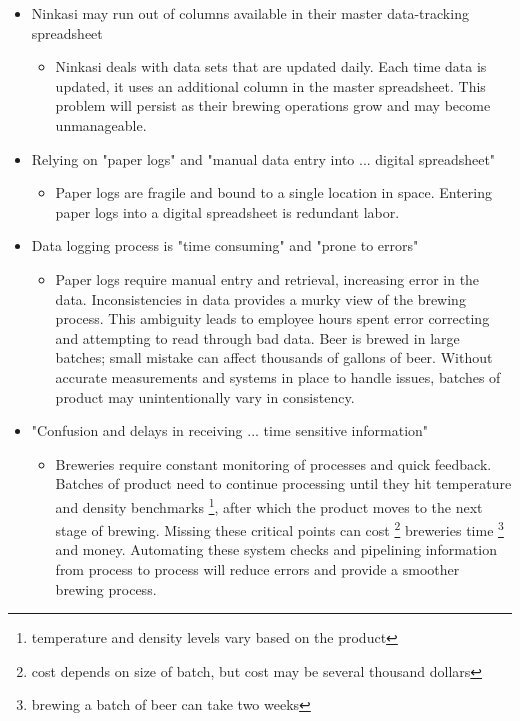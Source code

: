 \documentclass[draftclsnofoot,onecolumn,letterpaper,10pt]{IEEEtran}
\begin{document}
\begin{itemize}
    \item {Ninkasi may run out of columns available in their master data-tracking spreadsheet}
      \begin{itemize}
      \item {
				Ninkasi deals with data sets that are updated daily.
				Each time data is updated, it uses an additional column in the master spreadsheet.
				This problem will persist as their brewing operations grow and may become unmanageable.
			}
  	\end{itemize}

	\item {Relying on "paper logs" and "manual data entry into ... digital spreadsheet"}
	    \begin{itemize}
			\item {Paper logs are fragile and bound to a single location in space. Entering paper logs into a digital spreadsheet is redundant labor.}
	    \end{itemize}

	\item {Data logging process is "time consuming" and "prone to errors"}
      		\begin{itemize}
			\item {Paper logs require manual entry and retrieval, increasing error in the data.
				Inconsistencies in data provides a murky view of the brewing process.
				This ambiguity leads to employee hours spent error correcting and attempting to read through bad data.
				Beer is brewed in large batches; small mistake can affect thousands of gallons of beer.
				Without accurate measurements and systems in place to handle issues, batches of product may unintentionally vary in consistency.
			}
      		\end{itemize}

	\item {"Confusion and delays in receiving ... time sensitive information"}
      		\begin{itemize}
			\item {Breweries require constant monitoring of processes and quick feedback.
				Batches of product need to continue processing until they hit temperature and density benchmarks \footnote{temperature and density levels vary based on the product}, after which the product moves to the next stage of brewing.
				Missing these critical points can cost \footnote{cost depends on size of batch, but cost may be several thousand dollars} breweries time \footnote{brewing a batch of beer can take two weeks} and money.
				Automating these system checks and pipelining information from process to process will reduce errors and provide a smoother brewing process.
			}
      		\end{itemize}


\end{itemize}
\end{document}
